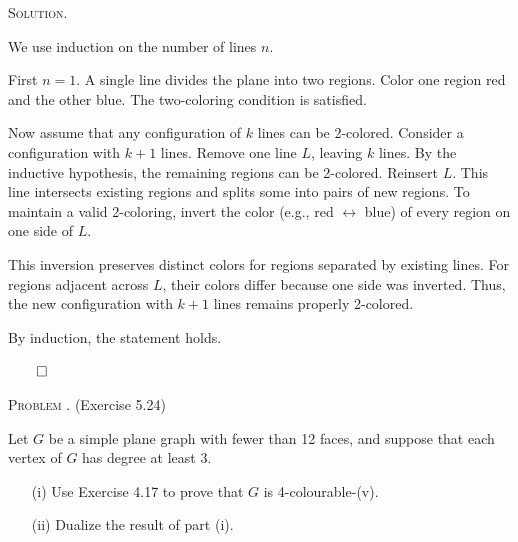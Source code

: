 \documentclass[12pt, a4paper, oneside]{ctexart}
\newcounter{problemname}
\newenvironment{problem}{\begin{framed}\stepcounter{problemname}\par\noindent\textsc{Problem \arabic{problemname}. }}{\end{framed}\par}
\newenvironment{solution}{%
	\par\noindent\textsc{Solution. }\ignorespaces
}{%
	\hfill$\qed$\par
}
\begin{document}
    \begin{solution} 
       
		We use induction on the number of lines \( n \).

		First $n = 1$. A single line divides the plane into two regions. Color one region red and the other blue. The two-coloring condition is satisfied.

		Now assume that any configuration of \( k \) lines can be 2-colored. Consider a configuration with \( k+1 \) lines. Remove one line \( L \), leaving \( k \) lines. By the inductive hypothesis, the remaining regions can be 2-colored. Reinsert \( L \). This line intersects existing regions and splits some into pairs of new regions. To maintain a valid 2-coloring, invert the color (e.g., red \(\leftrightarrow\) blue) of every region on one side of \( L \). 

		This inversion preserves distinct colors for regions separated by existing lines. For regions adjacent across \( L \), their colors differ because one side was inverted. Thus, the new configuration with \( k+1 \) lines remains properly 2-colored.

		By induction, the statement holds.

    \end{solution}

	\begin{problem}
		(Exercise 5.24)

		Let \( G \) be a simple plane graph with fewer than 12 faces, and suppose that each vertex of \( G \) has degree at least 3.

		\begin{enumerate}
			\item[(i)] Use Exercise 4.17 to prove that \( G \) is 4-colourable-(v).
			\item[(ii)] Dualize the result of part (i).
		\end{enumerate}

	\end{problem}
\end{document}

